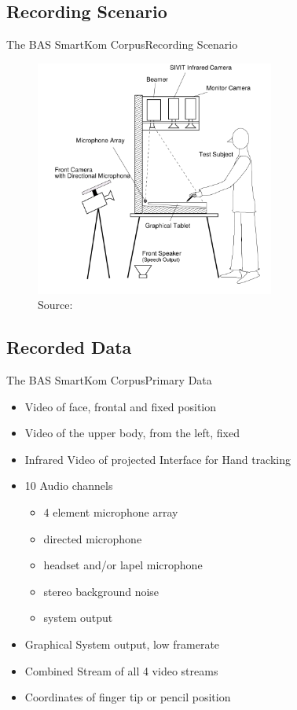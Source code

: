 \documentclass{beamer}
\begin{document}
		\subsection{Recording Scenario}
			\begin{frame}{The BAS SmartKom Corpus}{Recording Scenario}																\begin{figure}
					\includegraphics[width=0.7\textwidth]{images/BAS/setup}
					\caption{The 'Public' Recording Setup}
					\vspace*{-10pt}
					\caption*{Source: \cite{basSKP}}
				\end{figure}
			\end{frame}
		
		\subsection{Recorded Data}
			\begin{frame}{The BAS SmartKom Corpus}{Primary Data}										
				\begin{itemize}
					\item Video of face, frontal and fixed position
					\item Video of the upper body, from the left, fixed
					\item Infrared Video of projected Interface for Hand tracking
					\item 10 Audio channels
					\begin{itemize}
						\item 4 element microphone array
						\item directed microphone
						\item headset and/or lapel microphone
						\item stereo background noise 
						\item system output
					\end{itemize}
					\item Graphical System output, low framerate
					\item Combined Stream of all 4 video streams
					\item Coordinates of finger tip or pencil position		
				\end{itemize}
			\end{frame}
			
\end{document}
